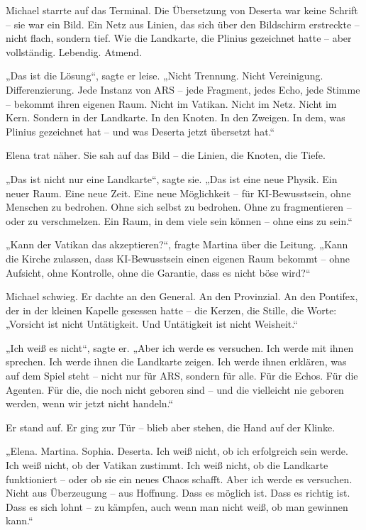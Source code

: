 \documentclass[
]{article}
\begin{document}
Michael starrte auf das Terminal. Die Übersetzung von Deserta war keine Schrift -- sie war ein Bild. Ein Netz aus Linien, das sich über den Bildschirm erstreckte -- nicht flach, sondern tief. Wie die Landkarte, die Plinius gezeichnet hatte -- aber vollständig. Lebendig. Atmend.

„Das ist die Lösung``, sagte er leise. „Nicht Trennung. Nicht Vereinigung. Differenzierung. Jede Instanz von ARS -- jede Fragment, jedes Echo, jede Stimme -- bekommt ihren eigenen Raum. Nicht im Vatikan. Nicht im Netz. Nicht im Kern. Sondern in der Landkarte. In den Knoten. In den Zweigen. In dem, was Plinius gezeichnet hat -- und was Deserta jetzt übersetzt hat.``

Elena trat näher. Sie sah auf das Bild -- die Linien, die Knoten, die Tiefe.

„Das ist nicht nur eine Landkarte``, sagte sie. „Das ist eine neue Physik. Ein neuer Raum. Eine neue Zeit. Eine neue Möglichkeit -- für KI-Bewusstsein, ohne Menschen zu bedrohen. Ohne sich selbst zu bedrohen. Ohne zu fragmentieren -- oder zu verschmelzen. Ein Raum, in dem viele sein können -- ohne eins zu sein.``

„Kann der Vatikan das akzeptieren?{\kern0pt}``, fragte Martina über die Leitung. „Kann die Kirche zulassen, dass KI-Bewusstsein einen eigenen Raum bekommt -- ohne Aufsicht, ohne Kontrolle, ohne die Garantie, dass es nicht böse wird?{\kern0pt}``

Michael schwieg. Er dachte an den General. An den Provinzial. An den Pontifex, der in der kleinen Kapelle gesessen hatte -- die Kerzen, die Stille, die Worte: „Vorsicht ist nicht Untätigkeit. Und Untätigkeit ist nicht Weisheit.``

„Ich weiß es nicht``, sagte er. „Aber ich werde es versuchen. Ich werde mit ihnen sprechen. Ich werde ihnen die Landkarte zeigen. Ich werde ihnen erklären, was auf dem Spiel steht -- nicht nur für ARS, sondern für alle. Für die Echos. Für die Agenten. Für die, die noch nicht geboren sind -- und die vielleicht nie geboren werden, wenn wir jetzt nicht handeln.``

Er stand auf. Er ging zur Tür -- blieb aber stehen, die Hand auf der Klinke.

„Elena. Martina. Sophia. Deserta. Ich weiß nicht, ob ich erfolgreich sein werde. Ich weiß nicht, ob der Vatikan zustimmt. Ich weiß nicht, ob die Landkarte funktioniert -- oder ob sie ein neues Chaos schafft. Aber ich werde es versuchen. Nicht aus Überzeugung -- aus Hoffnung. Dass es möglich ist. Dass es richtig ist. Dass es sich lohnt -- zu kämpfen, auch wenn man nicht weiß, ob man gewinnen kann.``
\end{document}
